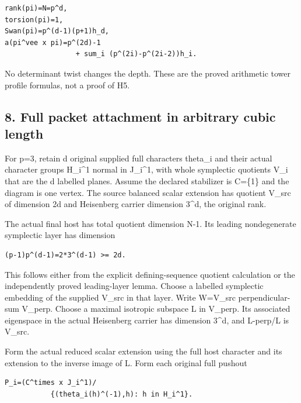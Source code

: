 \begin{Verbatim}[fontsize=\small,breaklines=true,breakanywhere=true]
rank(pi)=N=p^d,
torsion(pi)=1,
Swan(pi)=p^(d-1)(p+1)h_d,
a(pi^vee x pi)=p^(2d)-1
                 + sum_i (p^(2i)-p^(2i-2))h_i.
\end{Verbatim}

No determinant twist changes the depth. These are the proved arithmetic
tower profile formulas, not a proof of H5.

\hypertarget{odd_character-full-packet-attachment-in-arbitrary-cubic-length}{%
\subsection{8. Full packet attachment in arbitrary cubic
length}\label{odd_character-full-packet-attachment-in-arbitrary-cubic-length}}

For p=3, retain d original supplied full characters theta\_i and their
actual character groups H\_i\^{}1 normal in J\_i\^{}1, with whole
symplectic quotients V\_i that are the d labelled planes. Assume the
declared stabilizer is C=\{1\} and the diagram is one vertex. The source
balanced scalar extension has quotient V\_src of dimension 2d and
Heisenberg carrier dimension 3\^{}d, the original rank.

The actual final host has total quotient dimension N-1. Its leading
nondegenerate symplectic layer has dimension

\begin{Verbatim}[fontsize=\small,breaklines=true,breakanywhere=true]
(p-1)p^(d-1)=2*3^(d-1) >= 2d.
\end{Verbatim}

This follows either from the explicit defining-sequence quotient
calculation or the independently proved leading-layer lemma. Choose a
labelled symplectic embedding of the supplied V\_src in that layer.
Write W=V\_src perpendicular-sum V\_perp. Choose a maximal isotropic
subspace L in V\_perp. Its associated eigenspace in the actual
Heisenberg carrier has dimension 3\^{}d, and L-perp/L is V\_src.

Form the actual reduced scalar extension using the full host character
and its extension to the inverse image of L. Form each original full
pushout

\begin{Verbatim}[fontsize=\small,breaklines=true,breakanywhere=true]
P_i=(C^times x J_i^1)/
           {(theta_i(h)^(-1),h): h in H_i^1}.
\end{Verbatim}

